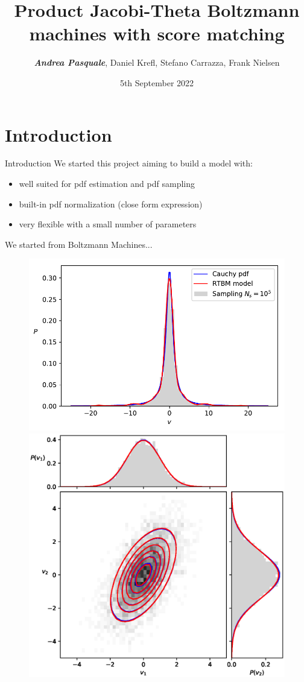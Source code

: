 \documentclass[10pt]{beamer}
\title{Product Jacobi-Theta Boltzmann machines with score matching}
\subtitle{}
\author{\textit{\textbf{Andrea Pasquale}}, Daniel Krefl, Stefano Carrazza, Frank Nielsen}
\date{5th September 2022}
\begin{document}
\maketitle

\section{Introduction}

\begin{frame}{Introduction}
    We started this project aiming to build a model with:
    \begin{itemize}
        \item well suited for pdf estimation and pdf sampling 
        \item built-in pdf normalization (close form expression)
        \item very flexible with a small number of parameters
    \end{itemize}
    We started from Boltzmann Machines...
    \begin{figure}
        \begin{center}
            \includegraphics[scale=0.5]{figures/cauchy.pdf}
            \includegraphics[scale=0.4]{figures/Gaussian2d.eps}

\end{center}
\end{figure}
\end{frame}
\end{document}
